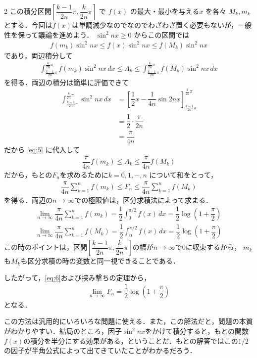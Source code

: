 \documentclass[../../main.tex]{subfiles}
\begin{document}
\begin{multicols}{2}
  この積分区間$\left[ \dfrac{k-1}{2n}\pi, \dfrac{k}{2n}\pi \right]$ で $f(x)$ の最大・最小を与える$x$ を各々 $M_k, m_k$ とする．今回は$f(x)$は単調減少なのでなのでわざわざ置く必要もないが，一般性を保って議論を進めよう．
  $\sin^2 nx \ge 0$ からこの区間では
  \begin{align}
    f(m_k) \sin^2 nx \le f(x) \sin^2 nx \le f(M_k) \sin^2 nx
  \end{align}
  であり，両辺積分して
  \begin{align}
    \int_{\frac{k-1}{2n}\pi}^{\frac{k}{2n}\pi} f(m_k) \sin^2 nx \, dx
    \le A_k
    \le \int_{\frac{k-1}{2n}\pi}^{\frac{k}{2n}\pi} f(M_k) \sin^2 nx \, dx \label{eq:5}
  \end{align}
  を得る．両辺の積分は簡単に評価できて
  \begin{align}
    \int_{\frac{k-1}{2n}\pi}^{\frac{k}{2n}\pi} \sin^2 nx \, dx
    & = \left[ \dfrac{1}{2}x - \dfrac{1}{4n}\sin 2nx \right]_{\frac{k-1}{2n}\pi}^{\frac{k}{2n}\pi} \\
    & = \dfrac{1}{2} \cdot \dfrac{\pi}{2n}                                                         \\
    & = \dfrac{\pi}{4n}
  \end{align}
  だから \cref{eq:5} に代入して
  \begin{align}
    \dfrac{\pi}{4n} f(m_k) \le A_k \le \dfrac{\pi}{4n} f(M_k)
  \end{align}
  だから，もとの$F_n$を求めるために$k=0,1,\cdots,n$ について和をとって，
  \begin{align}
    \dfrac{\pi}{4n} \sum_{k=1}^{n} f(m_k)
    \le F_n
    \le \dfrac{\pi}{4n} \sum_{k=1}^{n} f(M_k) \label{eq:6}
  \end{align}
  を得る．両辺の$n\to\infty$での極限値は，区分求積法によって求まる．
  \begin{align}
    \lim_{n\to\infty}\dfrac{\pi}{4n} \sum_{k=1}^{n} f(m_k) = \dfrac{1}{2} \int_0^{\pi/2} f(x) \, dx = \dfrac{1}{2} \log \left(1+\dfrac{\pi}{2}\right) \\
    \lim_{n\to\infty}\dfrac{\pi}{4n} \sum_{k=1}^{n} f(M_k) = \dfrac{1}{2} \int_0^{\pi/2} f(x) \, dx =  \dfrac{1}{2} \log \left(1+\dfrac{\pi}{2}\right)
  \end{align}
  この時のポイントは，区間$\left[ \dfrac{k-1}{2n}\pi, \dfrac{k}{2n}\pi \right]$の幅が$n\to\infty$で$0$に収束するから，
  $m_k$も$M_k$も区分求積の時の変数と同一視できることである．

  したがって，\cref{eq:6}および挟み撃ちの定理から，
  \begin{align}
    \lim_{n\to\infty} F_n = \dfrac{1}{2}\log \left(1+\dfrac{\pi}{2}\right)
  \end{align}
  となる．

  この方法は汎用的にいろいろな問題に使える．また，この解法だと，問題の本質がわかりやすい．結局のところ，因子$\sin^2 nx$をかけて積分すると，もとの関数$f(x)$の積分を半分にする効果がある，ということだ．もとの解答ではこの$1/2$の因子が半角公式によって出てきていたことがわかるだろう．
  \newpage
\end{multicols}
\end{document}
